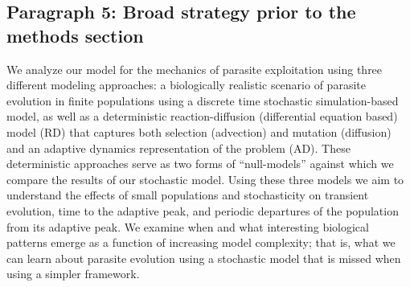\subsection*{Paragraph 5: Broad strategy prior to the methods section}

We analyze our model for the mechanics of parasite exploitation using three different modeling approaches: a biologically realistic scenario of parasite evolution in finite populations using a discrete time stochastic simulation-based model, as well as a deterministic reaction-diffusion (differential equation based) model (RD) that captures both selection (advection) and mutation (diffusion) and an adaptive dynamics representation of the problem (AD). These deterministic approaches serve as two forms of ``null-models'' against which we compare the results of our stochastic model. Using these three models we aim to understand the effects of small populations and stochasticity on transient evolution, time to the adaptive peak, and periodic departures of the population from its adaptive peak. We examine when and what interesting biological patterns emerge as a function of increasing model complexity; that is, what we can learn about parasite evolution using a stochastic model that is missed when using a simpler framework.